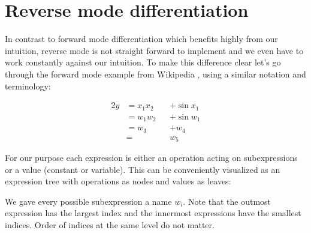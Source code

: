 \chapter{Reverse mode differentiation}\label{sec:reverseMode}

In contrast to forward mode differentiation which benefits highly from our intuition, reverse mode is not straight forward to implement and we even have to work constantly against our intuition. To make this difference clear let's go through the forward mode example from Wikipedia \cite{forwardAccumulationWiki}, using a similar notation and terminology:
\newcommand{\yExampleDiff}{
    \begin{alignat*}{2}
        y & = x_1x_2 &  & + \sin{x_1} \\
          & = w_1w_2 &  & + \sin{w_1} \\
          & = w_3    &  & + w_4       \\
          & =        &  & w_5
    \end{alignat*}
}
\yExampleDiff
For our purpose each expression is either an operation acting on subexpressions or a value (constant or variable). This can be conveniently visualized as an expression tree with operations as nodes and values as leaves:
\begin{center}
\end{center}
We gave every possible subexpression a name $w_i$. Note that the outmost expression has the largest index and the innermost expressions have the smallest indices. Order of indices at the same level do not matter.

